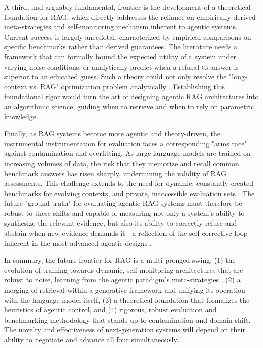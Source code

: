 \documentclass[11pt,a4paper]{article}
\begin{document}
A third, and arguably fundamental, frontier is the development of a theoretical foundation for RAG, which directly addresses the reliance on empirically derived meta-strategies and self-monitoring mechansm inherent to agentic systems. Current success is largely anecdotal, characterized by empirical comparisons on specific benchmarks rather than derived guarantees. The literature needs a framework that can formally bound the expected utility of a system under varying noise conditions, or analytically predict when a refusal to answer is superior to an educated guess. Such a theory could not only resolve the "long-context vs. RAG" optimization problem analytically \cite{arxiv:2409.01666v1,arxiv:2312.10997v5}. Establishing this foundational rigor would turn the art of designing agentic RAG architectures into an algorithmic science, guiding when to retrieve and when to rely on parametric knowledge.

Finally, as RAG systems become more agentic and theory-driven, the instrumental instrumentation for evaluation faces a corresponding "arms race" against contamination and overfitting. As large language models are trained on increasing volumes of data, the risk that they memorize and recall common benchmark answers has risen sharply, undermining the validity of RAG assessments. This challenge extends to the need for dynamic, constantly created benchmarks for evolving contexts, and private, inaccessible evaluation sets \cite{arxiv:2309.15217v1}. The future "ground truth" for evaluating agentic RAG systems must therefore be robust to these shifts and capable of measuring not only a system's ability to synthesize the relevant evidence, but also its ability to correctly refuse and abstain when new evidence demands it---a reflection of the self-corrective loop inherent in the most advanced agentic designs \cite{arxiv:2402.16457v1}.

In summary, the future frontier for RAG is a multi-pronged swing: (1) the evolution of training towards dynamic, self-monitoring architectures that are robust to noise, learning from the agentic paradigm's meta-strategies \cite{arxiv:1810.10176v2} , (2) a merging of retrieval within a generative framework and unifying its operation with the language model itself, (3) a theoretical foundation that formalizes the heuristics of agentic control, and (4) rigorous, robust evaluation and benchmarking methodology that stands up to contamination and domain shift. The novelty and effectiveness of next-generation systems will depend on their ability to negotiate and advance all four simultaneously.
\end{document}
